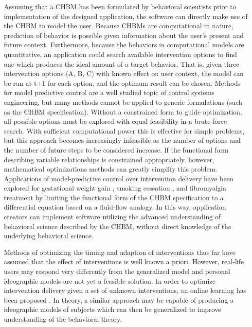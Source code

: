 \documentclass[runningheads,a4paper]{llncs}
\begin{document}
Assuming that a CHBM has been formulated by behavioral scientists prior to implementation of the designed application, the software can directly make use of the CHBM to model the user.
Because CHBMs are computational in nature, prediction of behavior is possible given information about the user's present and future context.
Furthermore, because the behaviors in computational models are quantitative, an application could search available intervention options to find one which produces the ideal amount of a target behavior.
That is, given three intervention options (A, B, C) with known effect on user context, the model can be run at t+1 for each option, and the optimum result can be chosen.
Methods for model predictive control are a well studied topic of control systems engineering, but many methods cannot be applied to generic formulations (such as the CHBM specification).
Without a constrained form to guide optimization, all possible options must be explored with equal feasibility in a brute-force search.
With sufficient computational power this is effective for simple problems, but this approach becomes increasingly infeasible as the number of options and the number of future steps to be considered increase.
If the functional form describing variable relationships is constrained appropriately, however, mathematical optimizations methods can greatly simplify this problem.
Applications of model-predictive control over intervention delivery have been explored for gestational weight gain \cite{dong2013hybrid, dong2014hybrid}, smoking cessation \cite{Timms2014hybrid}, and fibromyalgia treatment \cite{Deshpande2014optimized} by limiting the functional form of the CHBM specification to a differential equation based on a fluid-flow analogy.
In this way, application creators can implement software utilizing the advanced understanding of behavioral science described by the CHBM, without direct knowledge of the underlying behavioral science.

Methods of optimizing the timing and adaption of interventions thus far have assumed that the effect of interventions is well known a priori.
However, real-life users may respond very differently from the generalized model and personal ideographic models are not yet a feasible solution.
In order to optimize intervention delivery given a set of unknown interventions, an online learning has been proposed \cite{jaimes2015calma}.
In theory, a similar approach may be capable of producing a ideographic models of subjects which can then be generalized to improve understanding of the behavioral theory.
\end{document}
